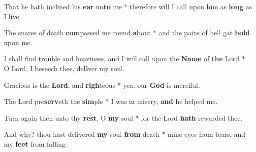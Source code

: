 \begin{multicols}{2}
	That he hath inclined his \textbf{ear} un\textbf{to} me * therefore will I call upon him as \textbf{long} as I live.
	
	The snares of death \textbf{com}passed me round \textbf{a}bout * and the pains of hell gat \textbf{hold} upon me.
	
	I shall find trouble and heaviness, and I will call upon the \textbf{Name} of \textbf{the} Lord * O Lord, I beseech thee, de\textbf{li}ver my soul.
	
	Gracious is the \textbf{Lord}, and \textbf{righ}teous * yea, our \textbf{God} is merciful.
	
	The Lord pre\textbf{serv}eth the \textbf{sim}ple * I was in misery, \textbf{and} he helped me.
	
	Turn again then unto thy \textbf{rest}, O \textbf{my} soul * for the Lord \textbf{hath} rewarded thee.
	
	And why? thou hast delivered \textbf{my} soul \textbf{from} death * mine eyes from tears, and my \textbf{feet} from falling.
	
\end{multicols}